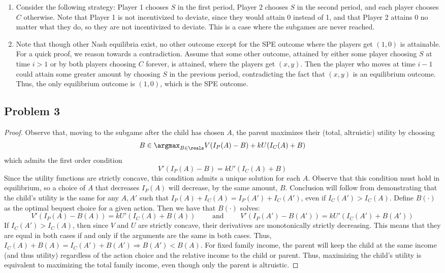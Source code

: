 \documentclass[10pt]{article}
\begin{document}
\begin{enumerate}
	\item Consider the following strategy: Player 1 chooses $S$ in the first period, Player 2 chooses $S$ in the second period, and each player chooses $C$ otherwise. Note that Player 1 is not incentivized to deviate, since they would attain 0 instead of 1, and that Player 2 attains 0 no matter what they do, so they are not incentivized to deviate. This is a case where the subgames are never reached.
	\item Note that though other Nash equilibria exist, no other outcome except for the SPE outcome where the players get $(1,0)$ is attainable. For a quick proof, we reason towards a contradiction. Assume that some other outcome, attained by either some player choosing $S$ at time $i > 1$ or by both players choosing $C$ forever, is attained, where the players get $(x,y)$. Then the player who moves at time $i - 1$ could attain some greater amount by choosing $S$ in the previous period, contradicting the fact that $(x,y)$ is an equilibrium outcome. Thus, the only equilibrium outcome is $(1,0)$, which is the SPE outcome.
\end{enumerate}

\subsection*{Problem 3}

\begin{proof}
	Observe that, moving to the subgame after the child has chosen $A$, the parent maximizes their (total, altruistic) utility by choosing \[B \in \argmax_{B \in \reals} V(I_P(A) - B) + k U(I_C(A) + B)\]which admits the first order condition \[V'(I_P(A)-B) = kU'(I_C(A)+B)\]Since the utility functions are strictly concave, this condition admits a unique solution for each $A$. Observe that this condition must hold in equilibrium, so a choice of $A$ that decreases $I_P(A)$ will decrease, by the same amount, $B$. Conclusion will follow from demonstrating that the child's utility is the same for any $A,A'$ such that $I_P(A) + I_C(A) = I_P(A') + I_C(A')$, even if $I_C(A') > I_C(A)$. Define $B(\cdot)$ as the optimal bequest choice for a given action. Then we have that $B(\cdot)$ solves: \[V'(I_P(A)-B(A)) = kU'(I_C(A)+B(A)) \qquad \text{ and } \qquad V'(I_P(A')-B(A')) = kU'(I_C(A')+B(A'))\]If $I_C(A') > I_C(A)$, then since $V$ and $U$ are strictly concave, their derivatives are monotonically strictly decreasing. This means that they are equal in both cases if and only if the arguments are the same in both cases. Thus, $I_C(A) + B(A) = I_C(A') + B(A') \Longrightarrow B(A') < B(A)$. For fixed family income, the parent will keep the child at the same income (and thus utility) regardless of the action choice and the relative income to the child or parent. Thus, maximizing the child's utility is equivalent to maximizing the total family income, even though only the parent is altruistic.
\end{proof}
\end{document}
